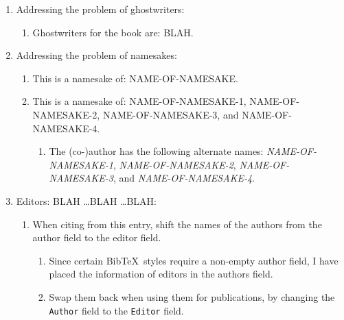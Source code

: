 \documentclass[letter,12pt]{article}
\begin{document}
\begin{enumerate}
\begin{enumerate}
		\begin{enumerate} \itemsep -2pt
		\item This allows us to indicate the subset of members of the organization or community that contributed to the publication, data set, or project, instead of the more inclusive ``members'' term.
		\end{enumerate}
	\end{enumerate}
\item Addressing the problem of ghostwriters: \vspace{-0.3cm}
	\begin{enumerate} \itemsep -2pt
	\item Ghostwriters for the book are: BLAH.
	\end{enumerate}
\item Addressing the problem of namesakes: \vspace{-0.3cm}
	\begin{enumerate} \itemsep -2pt
	\item This is a namesake of: NAME-OF-NAMESAKE.
	\item This is a namesake of: NAME-OF-NAMESAKE-1, NAME-OF-NAMESAKE-2, NAME-OF-NAMESAKE-3, and NAME-OF-NAMESAKE-4. \vspace{-0.2cm}
		\begin{enumerate} \itemsep -2pt
		\item The (co-)author has the following alternate names: {\it NAME-OF-NAMESAKE-1}, {\it NAME-OF-NAMESAKE-2}, {\it NAME-OF-NAMESAKE-3}, and {\it NAME-OF-NAMESAKE-4}.
		\end{enumerate}
	\end{enumerate}
\item Editors: BLAH \dots BLAH \dots BLAH: \vspace{-0.3cm}
	\begin{enumerate} \itemsep -2pt
	\item When citing from this entry, shift the names of the authors from the author field to the editor field. \vspace{-0.2cm}
		\begin{enumerate} \itemsep -2pt
		\item Since certain {\sc Bib}\TeX\ styles require a non-empty author field, I have placed the information of editors in the authors field. 
		\item Swap them back when using them for publications, by changing the {\tt Author} field to the {\tt Editor} field.

\end{enumerate}
\end{enumerate}
\end{enumerate}
\end{document}
